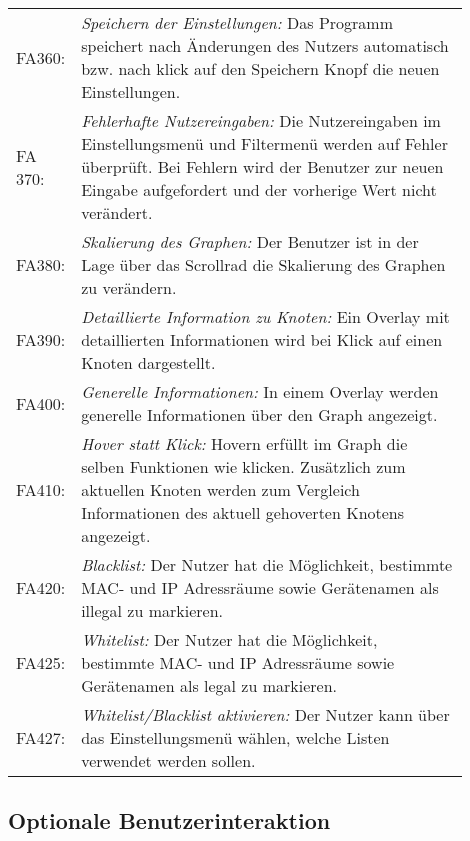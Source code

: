 \begin{tabular}{lp{0.9\linewidth}}

FA360: & \textit{Speichern der Einstellungen: }Das Programm speichert nach Änderungen des Nutzers automatisch bzw. nach klick auf den Speichern Knopf die neuen Einstellungen. \\

FA 370: & \textit{Fehlerhafte Nutzereingaben: }Die Nutzereingaben im Einstellungsmenü und Filtermenü werden auf Fehler überprüft. Bei Fehlern wird der Benutzer zur neuen Eingabe aufgefordert und der vorherige Wert nicht verändert. \\

FA380: & \textit{Skalierung des Graphen: }Der Benutzer ist in der Lage über das Scrollrad die Skalierung des Graphen zu verändern. \\

FA390: & \textit{Detaillierte Information zu Knoten: }Ein Overlay mit detaillierten Informationen wird bei Klick auf einen Knoten dargestellt. \\

FA400: & \textit{Generelle Informationen: }In einem Overlay werden generelle Informationen über den Graph angezeigt. \\

FA410: & \textit{Hover statt Klick: }Hovern erfüllt im Graph die selben Funktionen wie klicken. Zusätzlich zum aktuellen Knoten werden zum Vergleich Informationen des aktuell gehoverten Knotens angezeigt. \\

FA420: & \textit{Blacklist: }Der Nutzer hat die Möglichkeit, bestimmte MAC- und IP Adressräume sowie Gerätenamen als illegal zu markieren. \\

FA425: & \textit{Whitelist: }Der Nutzer hat die Möglichkeit, bestimmte MAC- und IP Adressräume sowie Gerätenamen als legal zu markieren. \\

FA427: & \textit{Whitelist/Blacklist aktivieren: }Der Nutzer kann über das Einstellungsmenü wählen, welche Listen verwendet werden sollen. \\

\end{tabular}

\subsection{Optionale Benutzerinteraktion}

